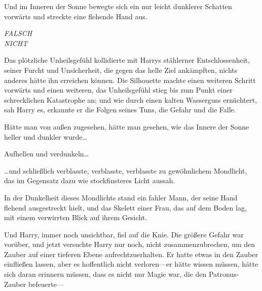 Und im Inneren der Sonne bewegte sich ein nur leicht dunklerer Schatten vorwärts und streckte eine flehende Hand aus.

\emph{FALSCH\\
NICHT}

Das plötzliche Unheilsgefühl kollidierte mit Harrys stählerner Entschlossenheit, seiner Furcht und Unsicherheit, die gegen das helle Ziel ankämpften, nichts anderes hätte ihn erreichen können. Die Silhouette machte einen weiteren Schritt vorwärts und einen weiteren, das Unheilsgefühl stieg bis zum Punkt einer schrecklichen Katastrophe an; und wie durch einen kalten Wasserguss ernüchtert, sah Harry es, erkannte er die Folgen seines Tuns, die Gefahr und die Falle.

Hätte man von außen zugesehen, hätte man gesehen, wie das Innere der Sonne heller und dunkler wurde…

Aufhellen und verdunkeln…

…und schließlich verblasste, verblasste, verblasste zu gewöhnlichem Mondlicht, das im Gegensatz dazu wie stockfinsteres Licht aussah.

In der Dunkelheit dieses Mondlichts stand ein fahler Mann, der seine Hand flehend ausgestreckt hielt, und das Skelett einer Frau, das auf dem Boden lag, mit einem verwirrten Blick auf ihrem Gesicht.

Und Harry, immer noch unsichtbar, fiel auf die Knie. Die größere Gefahr war vorüber, und jetzt versuchte Harry nur noch, nicht zusammenzubrechen, um den Zauber auf einer tieferen Ebene aufrechtzuerhalten. Er hatte etwas in den Zauber einfließen lassen, aber es hoffentlich nicht verloren—er hätte wissen müssen, hätte sich daran erinnern müssen, dass es nicht nur Magie war, die den Patronus-Zauber befeuerte—

